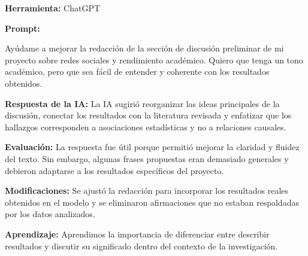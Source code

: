 \documentclass[12pt]{article}
\begin{document}
\begin{tcolorbox}[
colback=blue!5,
colframe=blue!75!white,
title=Apoyo en redacción académica]
\textbf{Herramienta:} ChatGPT

\textbf{Prompt:}

Ayúdame a mejorar la redacción de la sección de discusión preliminar de mi proyecto sobre redes sociales y rendimiento académico. Quiero que tenga un tono académico, pero que sea fácil de entender y coherente con los resultados obtenidos.

\textbf{Respuesta de la IA:}
La IA sugirió reorganizar las ideas principales de la discusión, conectar los resultados con la literatura revisada y enfatizar que los hallazgos corresponden a asociaciones estadísticas y no a relaciones causales.

\textbf{Evaluación:}
La respuesta fue útil porque permitió mejorar la claridad y fluidez del texto. Sin embargo, algunas frases propuestas eran demasiado generales y debieron adaptarse a los resultados específicos del proyecto.

\textbf{Modificaciones:}
Se ajustó la redacción para incorporar los resultados reales obtenidos en el modelo y se eliminaron afirmaciones que no estaban respaldadas por los datos analizados.

\textbf{Aprendizaje:}
Aprendimos la importancia de diferenciar entre describir resultados y discutir su significado dentro del contexto de la investigación.

\end{tcolorbox}
\end{document}
